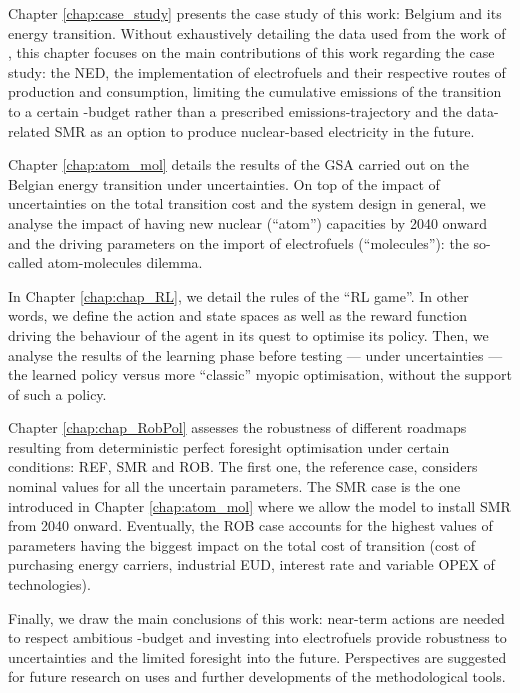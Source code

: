Chapter \ref{chap:case_study} presents the case study of this work: Belgium and its energy transition. Without exhaustively detailing the data used from the work of \citet{limpens2021generating}, this chapter focuses on the main contributions of this work regarding the case study: the \gls{NED}, the implementation of electrofuels and their respective routes of production and consumption, limiting  the cumulative emissions of the transition to a certain -budget rather than a prescribed emissions-trajectory and the data-related \gls{SMR} as an option to produce nuclear-based electricity in the future.

Chapter \ref{chap:atom_mol} details the results of the \gls{GSA} carried out on the Belgian energy transition under uncertainties. On top of the impact of uncertainties on the total transition cost and the system design in general, we analyse the impact of having new nuclear (``atom'') capacities by 2040 onward and the driving parameters on the import of electrofuels (``molecules''): the so-called atom-molecules dilemma.

In Chapter \ref{chap:chap_RL}, we detail the rules of the ``\gls{RL} game''. In other words, we define the action and state spaces as well as the reward function driving the behaviour of the agent in its quest to optimise its policy. Then, we analyse the results of the learning phase before testing --- under uncertainties --- the learned policy versus more ``classic'' myopic optimisation, \ie without the support of such a policy.

Chapter \ref{chap:chap_RobPol} assesses the robustness of different roadmaps resulting from deterministic perfect foresight optimisation under certain conditions: REF, SMR and ROB. The first one, the reference case, considers nominal values for all the uncertain parameters. The SMR case is the one introduced in Chapter \ref{chap:atom_mol} where we allow the model to install \gls{SMR} from 2040 onward. Eventually, the ROB case accounts for the highest values of parameters having the biggest impact on the total cost of transition (\ie cost of purchasing energy carriers, industrial \gls{EUD}, interest rate and variable \gls{OPEX} of technologies).

Finally, we draw the main conclusions of this work: near-term actions are needed to respect ambitious -budget and investing into electrofuels provide robustness to uncertainties and the limited foresight into the future.  Perspectives are suggested for future research on uses and further developments of the methodological tools.